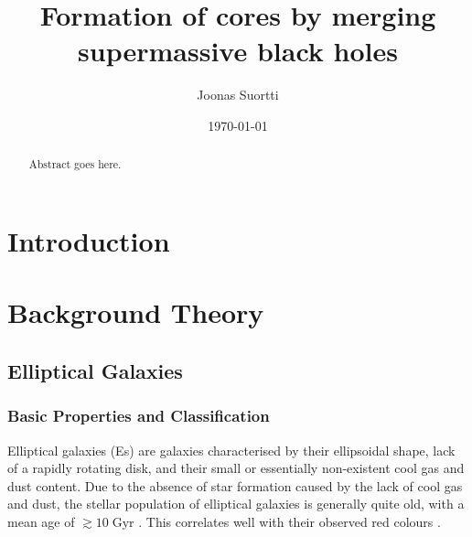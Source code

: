 \documentclass[english, oneside]{HYgradu}
\title{Formation of cores by merging supermassive black holes}
\author{Joonas Suortti}
\date{\today}
\begin{document}
\maketitle

\doublespacing

\begin{abstract}
Abstract goes here.
\end{abstract}

\mytableofcontents



\chapter{Introduction}

\chapter{Background Theory}

\section{Elliptical Galaxies} \label{section:elliptical}

\subsection{Basic Properties and Classification}

Elliptical galaxies (Es) are galaxies characterised by their ellipsoidal shape, lack of a rapidly rotating disk, and their small or essentially non-existent cool gas and dust content. Due to the absence of star formation caused by the lack of cool gas and dust, the stellar population of elliptical galaxies is generally quite old, with a mean age of $\gtrsim{10} \; \mathrm{Gyr}$ \citep{GalaxyFormationAndEvo2010}. This correlates well with their observed red colours \citep{Cappellari2016}.
\end{document}
